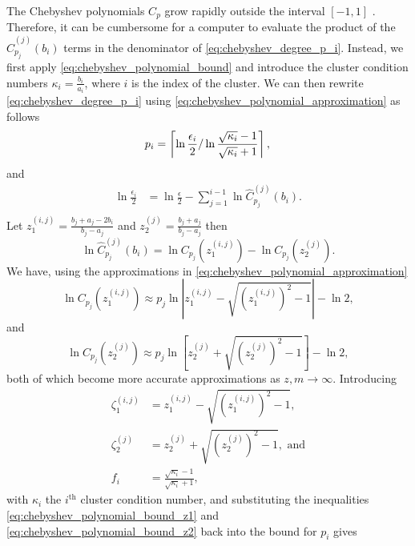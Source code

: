 The Chebyshev polynomials $C_p$ grow rapidly outside the interval $[-1,1]$ \cite[Section 4]{cg_sharpened_convrate_Axelsson1976}. Therefore, it can be cumbersome for a computer to evaluate the product of the $\hat{C}^{(j)}_{p_j}(b_i)$ terms in the denominator of \cref{eq:chebyshev_degree_p_i}. Instead, we first apply \cref{eq:chebyshev_polynomial_bound} and introduce the cluster condition numbers $\kappa_i = \frac{b_i}{a_i}$, where $i$ is the index of the cluster. We can then rewrite \cref{eq:chebyshev_degree_p_i} using \cref{eq:chebyshev_polynomial_approximation} as follows
\begin{equation*}
    p_i  =  \left\lceil\ln{\frac{\epsilon_i}{2}} / \ln{\frac{\sqrt{\kappa_i} - 1}{\sqrt{\kappa_i} + 1}}\right\rceil, \\
\end{equation*}
and
\begin{align*}
    \ln{\frac{\epsilon_i}{2}} & = \ln{\frac{\epsilon}{2}} - \sum_{j=1}^{i-1} \ln{\hat{C}^{(j)}_{p_j}(b_i)}. \\
\end{align*}
Let $z^{(i,j)}_1 = \frac{b_j + a_j - 2b_i}{b_j - a_j}$ and $z^{(j)}_2 = \frac{b_j + a_j}{b_j - a_j}$ then
\begin{equation*}
    \ln{\hat{C}^{(j)}_{p_j}(b_i)} = \ln{C_{p_j}(z^{(i,j)}_1)} - \ln{C_{p_j}(z^{(j)}_2)}.
\end{equation*}
We have, using the approximations in \cref{eq:chebyshev_polynomial_approximation}
\begin{equation}
    \ln{C_{p_j}(z^{(i,j)}_1)} \approx p_j \ln{\left|z^{(i,j)}_1 - \sqrt{\left(z^{(i,j)}_1\right)^2 - 1}\right|} - \ln{2},
    \label{eq:chebyshev_polynomial_bound_z1}
\end{equation}
and
\begin{equation}
    \ln{C_{p_j}(z^{(j)}_2)} \approx p_j \ln{\left[z^{(j)}_2 + \sqrt{\left(z^{(j)}_2\right)^2 - 1}\right]} - \ln{2},
    \label{eq:chebyshev_polynomial_bound_z2}
\end{equation}
both of which become more accurate approximations as $z,m\rightarrow\infty$. Introducing
\begin{align*}
    \zeta^{(i,j)}_1 & = z^{(i,j)}_1 - \sqrt{\left(z^{(i,j)}_1\right)^2 - 1},         \\
    \zeta^{(j)}_2   & = z^{(j)}_2 + \sqrt{\left(z^{(j)}_2\right)^2 - 1}, \text{ and} \\
    f_i             & = \frac{\sqrt{\kappa_i} - 1}{\sqrt{\kappa_i} + 1},
\end{align*}
with $\kappa_i$ the $i^{\text{th}}$ cluster condition number, and substituting the inequalities \ref{eq:chebyshev_polynomial_bound_z1} and \ref{eq:chebyshev_polynomial_bound_z2} back into the bound for $p_i$ gives

